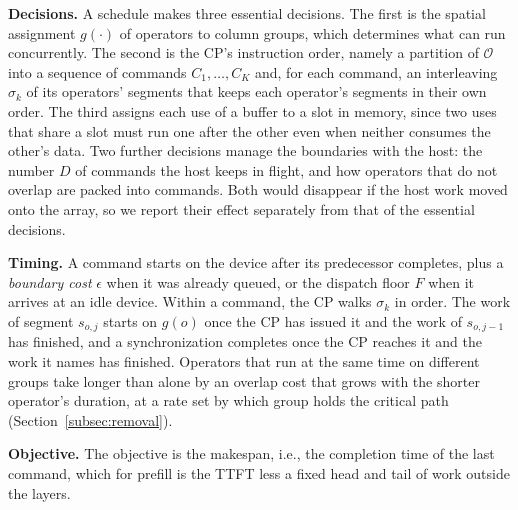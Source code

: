 \textbf{Decisions.}
A schedule makes three essential decisions.
The first is the spatial assignment $g(\cdot)$ of operators to column groups, which determines what can run concurrently.
The second is the CP's instruction order, namely a partition of $\mathcal{O}$ into a sequence of commands $C_1, \dots, C_K$ and, for each command, an interleaving $\sigma_k$ of its operators' segments that keeps each operator's segments in their own order.
The third assigns each use of a buffer to a slot in memory, since two uses that share a slot must run one after the other even when neither consumes the other's data.
Two further decisions manage the boundaries with the host: the number $D$ of commands the host keeps in flight, and how operators that do not overlap are packed into commands.
Both would disappear if the host work moved onto the array, so we report their effect separately from that of the essential decisions.

\textbf{Timing.}
A command starts on the device after its predecessor completes, plus a \emph{boundary cost} $\epsilon$ when it was already queued, or the dispatch floor $F$ when it arrives at an idle device.
Within a command, the CP walks $\sigma_k$ in order.
The work of segment $s_{o,j}$ starts on $g(o)$ once the CP has issued it and the work of $s_{o,j-1}$ has finished, and a synchronization completes once the CP reaches it and the work it names has finished.
Operators that run at the same time on different groups take longer than alone by an overlap cost that grows with the shorter operator's duration, at a rate set by which group holds the critical path (Section~\ref{subsec:removal}).

\textbf{Objective.}
The objective is the makespan, i.e., the completion time of the last command, which for prefill is the TTFT less a fixed head and tail of work outside the layers.

